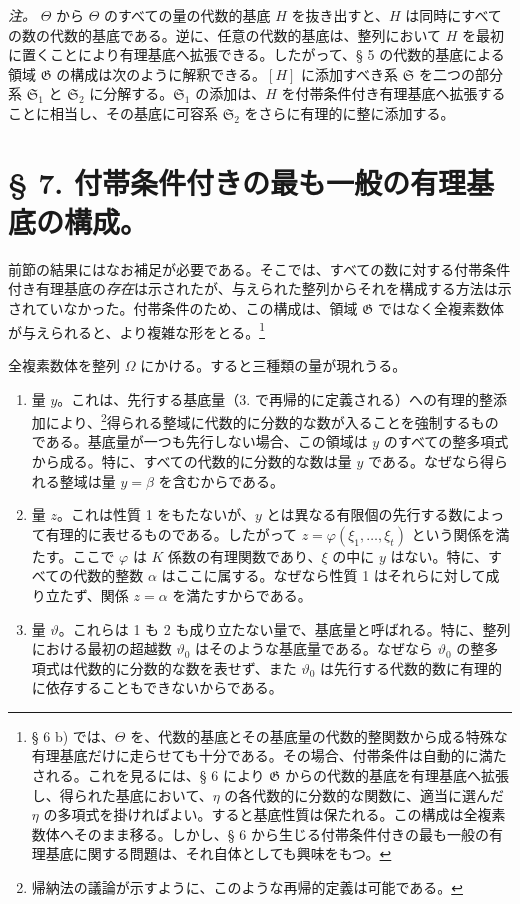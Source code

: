\emph{注。} $\Theta$ から $\Theta$ のすべての量の代数的基底 $H$ を抜き出すと、$H$ は同時にすべての数の代数的基底である。逆に、任意の代数的基底は、整列において $H$ を最初に置くことにより有理基底へ拡張できる。したがって、§ 5 の代数的基底による領域 $\mathfrak G$ の構成は次のように解釈できる。$[H]$ に添加すべき系 $\mathfrak S$ を二つの部分系 $\mathfrak S_1$ と $\mathfrak S_2$ に分解する。$\mathfrak S_1$ の添加は、$H$ を付帯条件付き有理基底へ拡張することに相当し、その基底に可容系 $\mathfrak S_2$ をさらに有理的に整に添加する。

\section*{§ 7. 付帯条件付きの最も一般の有理基底の構成。}

前節の結果にはなお補足が必要である。そこでは、すべての数に対する付帯条件付き有理基底の\emph{存在}は示されたが、与えられた整列からそれを構成する方法は示されていなかった。付帯条件のため、この構成は、領域 $\mathfrak G$ ではなく全複素数体が与えられると、より複雑な形をとる。\footnote{§ 6 b) では、$\Theta$ を、代数的基底とその基底量の代数的整関数から成る特殊な有理基底だけに走らせても十分である。その場合、付帯条件は自動的に満たされる。これを見るには、§ 6 により $\mathfrak G$ からの代数的基底を有理基底へ拡張し、得られた基底において、$\eta$ の各代数的に分数的な関数に、適当に選んだ $\eta$ の多項式を掛ければよい。すると基底性質は保たれる。この構成は全複素数体へそのまま移る。しかし、§ 6 から生じる付帯条件付きの最も一般の有理基底に関する問題は、それ自体としても興味をもつ。}

全複素数体を整列 $\Omega$ にかける。すると三種類の量が現れうる。
\begin{enumerate}
\item[1.] 量 $y$。これは、先行する基底量（3. で再帰的に定義される）への有理的整添加により、\footnote{帰納法の議論が示すように、このような再帰的定義は可能である。}得られる整域に代数的に分数的な数が入ることを強制するものである。基底量が一つも先行しない場合、この領域は $y$ のすべての整多項式から成る。特に、すべての代数的に分数的な数は量 $y$ である。なぜなら得られる整域は量 $y=\beta$ を含むからである。
\item[2.] 量 $z$。これは性質 1 をもたないが、$y$ とは異なる有限個の先行する数によって有理的に表せるものである。したがって $z=\varphi(\xi_1,\ldots,\xi_t)$ という関係を満たす。ここで $\varphi$ は $K$ 係数の有理関数であり、$\xi$ の中に $y$ はない。特に、すべての代数的整数 $\alpha$ はここに属する。なぜなら性質 1 はそれらに対して成り立たず、関係 $z=\alpha$ を満たすからである。
\item[3.] 量 $\vartheta$。これらは 1 も 2 も成り立たない量で、基底量と呼ばれる。特に、整列における最初の超越数 $\vartheta_0$ はそのような基底量である。なぜなら $\vartheta_0$ の整多項式は代数的に分数的な数を表せず、また $\vartheta_0$ は先行する代数的数に有理的に依存することもできないからである。
\end{enumerate}

